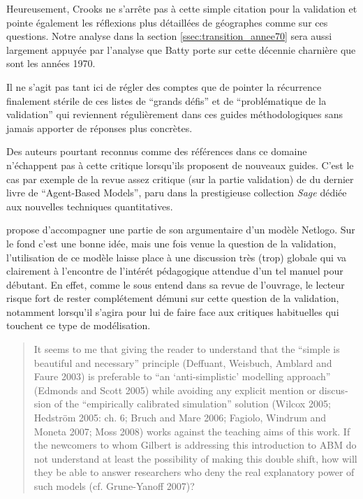 Heureusement, Crooks ne s'arrête pas à cette simple citation pour la validation et pointe également les réflexions plus détaillées de géographes comme \textcites{Batty2001, Batty2005b} sur ces questions. Notre analyse dans la section \ref{ssec:transition_annee70} sera aussi largement appuyée par l'analyse que Batty porte sur cette décennie charnière que sont les années 1970.

Il ne s'agit pas tant ici de régler des comptes que de pointer la récurrence finalement stérile de ces listes de \enquote{grands défis} et de \enquote{problématique de la validation} qui reviennent régulièrement dans ces guides méthodologiques sans jamais apporter de réponses plus concrètes.

Des auteurs pourtant reconnus comme des références dans ce domaine n'échappent pas à cette critique lorsqu'ils proposent de nouveaux guides. C'est le cas par exemple de la revue assez critique (sur la partie validation) de \textcite{Manzo2007a} du dernier livre de \textcite{Gilbert2008} \foreignquote{english}{Agent-Based Models}, paru dans la prestigieuse collection \textit{Sage} dédiée aux nouvelles techniques quantitatives.

\textcite{Gilbert2008} propose d'accompagner une partie de son argumentaire d'un modèle Netlogo. Sur le fond c'est une bonne idée, mais une fois venue la question de la validation, l'utilisation de ce modèle laisse place à une discussion très (trop) globale qui va clairement à l'encontre de l'intérét pédagogique attendue d'un tel manuel pour débutant. En effet, comme le sous entend \textcite{Manzo2007a} dans sa revue de l'ouvrage, le lecteur risque fort de rester complétement démuni sur cette question de la validation, notamment lorsqu'il s'agira pour lui de faire face aux critiques habituelles qui touchent ce type de modélisation.

\foreignblockquote{english}[\cite{Manzo2007a}]{It seems to me that giving the reader to understand that the \enquote{simple is beautiful and necessary} principle (Deffuant, Weisbuch, Amblard and Faure 2003) is preferable to \enquote{an \enquote{anti-simplistic} modelling approach} (Edmonds and Scott 2005) while avoiding any explicit mention or discussion of the \enquote{empirically
calibrated simulation} solution (Wilcox 2005; Hedström 2005: ch. 6; Bruch and Mare 2006; Fagiolo, Windrum and Moneta 2007; Moss 2008) works against the teaching aims of this work. If the newcomers to whom Gilbert is addressing this introduction to ABM do not understand at least the possibility of making this double shift, how will they be able to answer researchers who deny the real explanatory power of such models (cf. Grune-Yanoff 2007)?}

